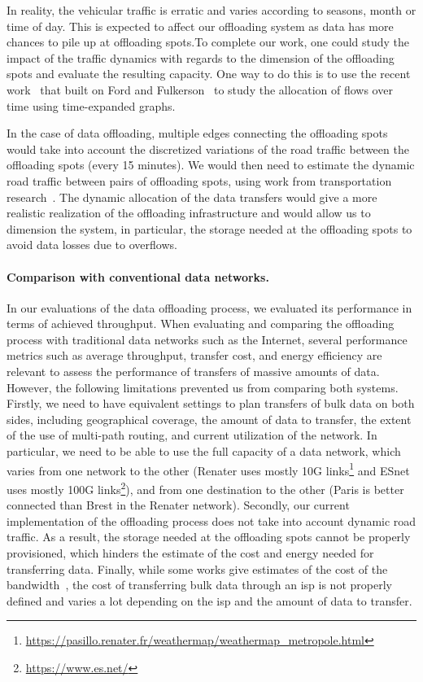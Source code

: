 In reality, the vehicular traffic is erratic and varies according to seasons, month or time of day. This is expected to affect our offloading system as data has more chances to pile up at offloading spots.To complete our work, one could study the impact of the traffic dynamics with regards to the dimension of the offloading spots and evaluate the resulting capacity. One way to do this is to use the recent work~\cite{fleischer2007quickest} that built on Ford and Fulkerson~\cite{ford2015flows} to study the allocation of flows over time using time-expanded graphs. 

In the case of data offloading, multiple edges connecting the offloading spots would take into account the discretized variations of the road traffic between the offloading spots (\eg every 15 minutes). We would then need to estimate the dynamic road traffic between pairs of offloading spots, using work from transportation research~\cite{cascetta1993dynamic,bierlaire2004efficient}. The dynamic allocation of the data transfers would give a more realistic realization of the offloading infrastructure and would allow us to dimension the system, in particular, the storage needed at the offloading spots to avoid data losses due to overflows.

\paragraph{Comparison with conventional data networks.}
In our evaluations of the data offloading process, we evaluated its performance in terms of achieved throughput. When evaluating and comparing the offloading process with traditional data networks such as the Internet, several performance metrics such as average throughput, transfer cost, and energy efficiency are relevant to assess the performance of transfers of massive amounts of data. However, the following limitations prevented us from comparing both systems. Firstly, we need to have equivalent settings to plan transfers of bulk data on both sides, including geographical coverage, the amount of data to transfer, the extent of the use of multi-path routing, and current utilization of the network. In particular, we need to be able to use the full capacity of a data network, which varies from one network to the other (\eg Renater uses mostly 10G links\footnote{\url{https://pasillo.renater.fr/weathermap/weathermap_metropole.html}} and ESnet uses mostly 100G links\footnote{\url{https://www.es.net/}}), and from one destination to the other (\eg Paris is better connected than Brest in the Renater network). Secondly, our current implementation of the offloading process does not take into account dynamic road traffic. As a result, the storage needed at the offloading spots cannot be properly provisioned, which hinders the estimate of the cost and energy needed for transferring data. Finally, while some works give estimates of the cost of the bandwidth~\cite{laoutaris2013delay,jin2016optimizing}, the cost of transferring bulk data through an \acrfull{isp} is not properly defined and varies a lot depending on the \acrshort{isp} and the amount of data to transfer.

